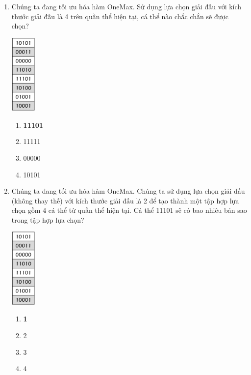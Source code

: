 \documentclass{book}
\begin{document}
\begin{enumerate}
    \item Chúng ta đang tối ưu hóa hàm OneMax. Sử dụng lựa chọn giải đấu với kích thước giải đấu là 4 trên quần thể hiện tại, cá thể nào chắc chắn sẽ được chọn?
    \begin{center}
        \includegraphics[width=0.1\textwidth]{images/quiz2_2.png}
    \end{center}
    \begin{multicols}{2}
        \begin{enumerate}[label=\Alph*]
            \item \textbf{11101}
            \item 11111
            \item 00000
            \item 10101
        \end{enumerate}
    \end{multicols}

    \item Chúng ta đang tối ưu hóa hàm OneMax. Chúng ta sử dụng lựa chọn giải đấu (không thay thế) với kích thước giải đấu là 2 để tạo thành một tập hợp lựa chọn gồm 4 cá thể từ quần thể hiện tại. Cá thể 11101 sẽ có bao nhiêu bản sao trong tập hợp lựa chọn?
    \begin{center}
        \includegraphics[width=0.1\textwidth]{images/quiz2_2.png}
    \end{center}
    \begin{multicols}{2}
        \begin{enumerate}[label=\Alph*]
            \item \textbf{1}
            \item 2
            \item 3
            \item 4
        \end{enumerate}
    \end{multicols}


\end{enumerate}
\end{document}
